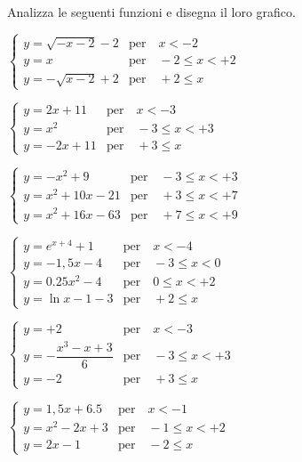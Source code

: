 \begin{esercizio}\label{ese:stufun.8e}
Analizza le seguenti funzioni e disegna il loro grafico.
\begin{multicols}{2}
 \begin{enumeratea}
  \item 
\(\begin{cases}
y = \sqrt{-x-2}-2 & \text{per} \quad x < -2 \\
y = x & \text{per} \quad -2 \leq x < +2\\
y = -\sqrt{x-2}+2 & \text{per} \quad +2 \leq x
\end{cases} \) \\ %
  \item 
\(\begin{cases}
y = 2x+11 & \text{per} \quad x < -3 \\
y = x^2 & \text{per} \quad -3 \leq x < +3\\
y = -2x+11 & \text{per} \quad +3 \leq x
\end{cases} \) \\ %
  \item 
\(\begin{cases}
y = -x^2+9 & \text{per} \quad -3 \leq x < +3 \\
y = x^2+10x-21 & \text{per} \quad +3 \leq x < +7\\
y = x^2+16x-63 & \text{per} \quad +7 \leq x < +9
\end{cases} \) \\ %
  \item 
\(\begin{cases}
y = e^{x+4}+1 & \text{per} \quad x < -4 \\
y = -1,5x -4 & \text{per} \quad -3 \leq x < 0\\
y = 0.25x^2-4 & \text{per} \quad 0 \leq x < +2\\
y = \ln{x-1} -3 & \text{per} \quad +2 \leq x
\end{cases} \) \\ %
  \item 
\(\begin{cases}
y = +2 & \text{per} \quad x < -3 \\
y = -\dfrac{x^3-x+3}{6} & \text{per} \quad -3 \leq x < +3\\
y = -2 & \text{per} \quad +3 \leq x
\end{cases} \) \\ [1em] %
  \item 
\(\begin{cases}
y = 1,5x+6.5 & \text{per} \quad x < -1 \\
y = x^2-2x+3 & \text{per} \quad -1 \leq x < +2\\
y = 2x-1 & \text{per} \quad -2 \leq x
\end{cases} \) \\ %
 \end{enumeratea}
\end{multicols}
\end{esercizio}

